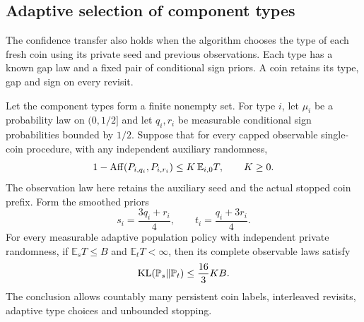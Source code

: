 \clearpage
\subsection{Adaptive selection of component types}
\label{sec:typed-confidence}

The confidence transfer also holds when the algorithm chooses the type
of each fresh coin using its private seed and previous observations.
Each type has a known gap law and a fixed pair of conditional sign
priors. A coin retains its type, gap and sign on every revisit.

\begin{theorem}
\label{thm:typed-confidence-verified}
Let the component types form a finite nonempty set. For type $i$, let
$\mu_i$ be a probability law on $(0,1/2]$ and let $q_i,r_i$ be measurable
conditional sign probabilities bounded by $1/2$. Suppose that for every
capped observable single-coin procedure, with any independent auxiliary
randomness,
\[
 1-\operatorname{Aff}(P_{i,q_i},P_{i,r_i})\le K\,\mathbb E_{i,0}T,
 \qquad K\ge0.
\]
The observation law here retains the auxiliary seed and the actual
stopped coin prefix. Form the smoothed priors
\[
 s_i=\frac{3q_i+r_i}{4},
 \qquad t_i=\frac{q_i+3r_i}{4}.
\]
For every measurable adaptive population policy with independent
private randomness, if $\mathbb E_s T\le B$ and
$\mathbb E_tT<\infty$, then its complete observable laws satisfy
\[
 \operatorname{KL}(\mathbb P_s\Vert\mathbb P_t)\le\frac{16}{3}KB.
\]
The conclusion allows countably many persistent coin labels,
interleaved revisits, adaptive type choices and unbounded stopping.
\end{theorem}

